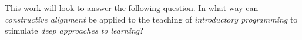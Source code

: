 This work will look to answer the following question. In what way can \emph{constructive alignment} be applied to the teaching of \emph{introductory programming} to stimulate \emph{deep approaches to learning}?





